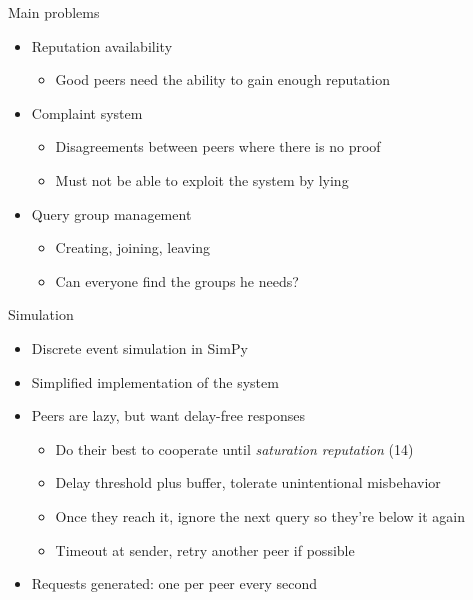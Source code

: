 \documentclass[presentation,english,usenames,dvipsnames]{beamer}
\begin{document}
\begin{frame}{Main problems}
  \begin{itemize}
    \item<alert@2> Reputation availability
    \begin{itemize}
      \item Good peers need the ability to gain enough reputation
    \end{itemize}
    \item Complaint system
    \begin{itemize}
      \item Disagreements between peers where there is no proof
      \item Must not be able to exploit the system by lying
    \end{itemize}
    \item Query group management
    \begin{itemize}
      \item Creating, joining, leaving
      \item Can everyone find the groups he needs?
    \end{itemize}
  \end{itemize}
\end{frame}

\begin{frame}{Simulation}
  \begin{itemize}
    \item Discrete event simulation in SimPy
    \item Simplified implementation of the system

    \pause

    \item Peers are lazy, but want delay-free responses
    \begin{itemize}
      \item Do their best to cooperate until \emph{saturation reputation} (14)
      \item Delay threshold plus buffer, tolerate unintentional misbehavior

      \pause

      \item Once they reach it, ignore the next query so they're below it again
      \item Timeout at sender, retry another peer if possible
    \end{itemize}

    \pause

    \item Requests generated: one per peer every second
  \end{itemize}
\end{frame}
\end{document}
